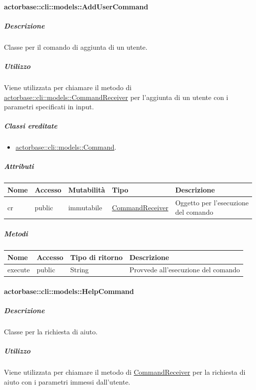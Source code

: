 \documentclass{scalatekids-article}
\begin{document}
\paragraph{actorbase::cli::models::AddUserCommand}
\label{sec:actorbase::cli::models::AddUserCommand}

\subparagraph{Descrizione}
Classe per il comando di aggiunta di un utente.

\subparagraph{Utilizzo}

Viene utilizzata per chiamare il metodo di
\hyperref[sec:actorbase::cli::models::CommandReceiver]{actorbase::cli::models::CommandReceiver} per l'aggiunta di un utente con i
parametri specificati in input.

\subparagraph{Classi ereditate}

\begin{itemize}
\item \hyperref[sec:actorbase::cli::models::Command]{actorbase::cli::models::Command}.
\end{itemize}

\subparagraph{Attributi}

\begin{tabular}{| p{1cm} | p{1.5cm} | p{2cm} | p{4cm} | p{8.5cm} |}
  \hline
  Nome & Accesso & Mutabilità & Tipo & Descrizione\\
  \hline
  cr & public & immutabile & \hyperref[sec:actorbase::cli::models::CommandReceiver]{CommandReceiver} & Oggetto per l'esecuzione del comando\\
  \hline
\end{tabular}

\subparagraph{Metodi}

\begin{tabular}{| l | l | l | l |}
  \hline
  Nome & Accesso & Tipo di ritorno & Descrizione\\
  \hline
  execute & public & String & Provvede all'esecuzione del comando\\
  \hline
\end{tabular}

\paragraph{actorbase::cli::models::HelpCommand}
\label{sec:actorbase::cli::models::HelpCommand}

\subparagraph{Descrizione}
Classe per la richiesta di aiuto.

\subparagraph{Utilizzo}

Viene utilizzata per chiamare il metodo di
\hyperref[sec:actorbase::cli::models::CommandReceiver]{CommandReceiver} per la richiesta di aiuto con i
parametri immessi dall'utente.
\end{document}
